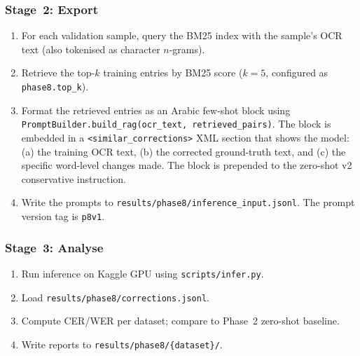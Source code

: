 \subsubsection{Stage~2: Export}

\begin{enumerate}
  \item For each validation sample, query the BM25 index with the sample's
        OCR text (also tokenised as character $n$-grams).

  \item Retrieve the top-$k$ training entries by BM25 score ($k = 5$,
        configured as \texttt{phase8.top\_k}).

  \item Format the retrieved entries as an Arabic few-shot block using
        \texttt{PromptBuilder.build\_rag(ocr\_text, retrieved\_pairs)}.
        The block is embedded in a \texttt{<similar\_corrections>} XML section
        that shows the model: (a) the training OCR text, (b) the corrected
        ground-truth text, and (c) the specific word-level changes made. The
        block is prepended to the zero-shot v2 conservative instruction.

  \item Write the prompts to \texttt{results/phase8/inference\_input.jsonl}.
        The prompt version tag is \texttt{p8v1}.
\end{enumerate}

\subsubsection{Stage~3: Analyse}

\begin{enumerate}
  \item Run inference on Kaggle GPU using \texttt{scripts/infer.py}.
  \item Load \texttt{results/phase8/corrections.jsonl}.
  \item Compute CER/WER per dataset; compare to Phase~2 zero-shot baseline.
  \item Write reports to \texttt{results/phase8/\{dataset\}/}.
\end{enumerate}

